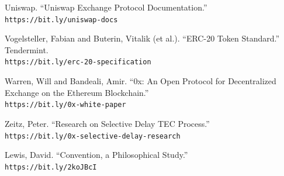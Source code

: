 \documentclass[10pt]{article}
\begin{document}
\begin{thebibliography}{9}
Uniswap. ``Uniswap Exchange Protocol Documentation.''
\\\texttt{https://bit.ly/uniswap-docs}

Vogelsteller, Fabian and Buterin, Vitalik (et al.). ``ERC-20 Token Standard.'' Tendermint.
\\\texttt{https://bit.ly/erc-20-specification}

Warren, Will and Bandeali, Amir. ``0x: An Open Protocol for Decentralized Exchange on the Ethereum Blockchain.''
\\\texttt{https://bit.ly/0x-white-paper}

Zeitz, Peter. ``Research on Selective Delay TEC Process.''
\\\texttt{https://bit.ly/0x-selective-delay-research}

Lewis, David. ``Convention, a Philosophical Study.''
\\\texttt{https://bit.ly/2koJBcI}

\end{thebibliography}


\end{document}

